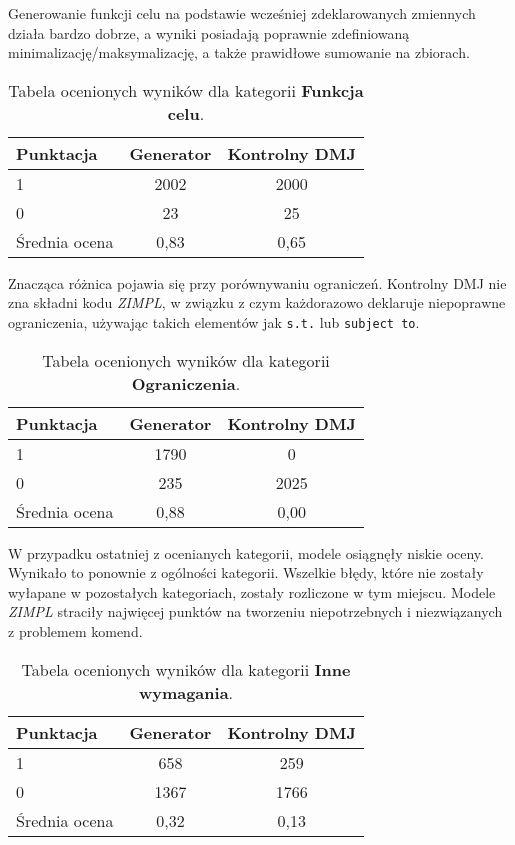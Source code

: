Generowanie funkcji celu na podstawie wcześniej zdeklarowanych zmiennych działa bardzo dobrze, a wyniki posiadają poprawnie zdefiniowaną minimalizację/maksymalizację, a także prawidłowe sumowanie na zbiorach.

\begin{table}[H]
\caption{Tabela ocenionych wyników dla kategorii \textbf{Funkcja celu}.}\label{tab:tabela20}
\centering%
\begin{tabular}{|l|c|c|}
\hline
\textbf{Punktacja} & \textbf{Generator} & \textbf{Kontrolny DMJ}\\
\hline
1 & 2002 & 2000 \\
\hline
0 & 23 & 25 \\
\hline
Średnia ocena & 0,83 & 0,65 \\
\hline
\end{tabular}
\end{table}

Znacząca różnica pojawia się przy porównywaniu ograniczeń. Kontrolny DMJ nie zna składni kodu  \textit{ZIMPL}, w związku z czym każdorazowo deklaruje niepoprawne ograniczenia, używając takich elementów jak \texttt{s.t.} lub \texttt{subject to}.

\begin{table}[H]
\caption{Tabela ocenionych wyników dla kategorii \textbf{Ograniczenia}.}\label{tab:tabela21}
\centering%
\begin{tabular}{|l|c|c|}
\hline
\textbf{Punktacja} & \textbf{Generator} & \textbf{Kontrolny DMJ}\\
\hline
1 & 1790 & 0 \\
\hline
0 & 235 & 2025 \\
\hline
Średnia ocena & 0,88 & 0,00 \\
\hline
\end{tabular}
\end{table}


W przypadku ostatniej z ocenianych kategorii, modele osiągnęły niskie oceny. Wynikało to ponownie z ogólności kategorii. Wszelkie błędy, które nie zostały wyłapane w pozostałych kategoriach, zostały rozliczone w tym miejscu. Modele  \textit{ZIMPL} straciły najwięcej punktów na tworzeniu niepotrzebnych i niezwiązanych z problemem komend. 

\begin{table}[H]
\caption{Tabela ocenionych wyników dla kategorii \textbf{Inne wymagania}.}\label{tab:tabela22}
\centering%
\begin{tabular}{|l|c|c|}
\hline
\textbf{Punktacja} & \textbf{Generator} & \textbf{Kontrolny DMJ}\\
\hline
1 & 658 & 259 \\
\hline
0 & 1367 & 1766 \\
\hline
Średnia ocena & 0,32 & 0,13 \\
\hline
\end{tabular}
\end{table}


